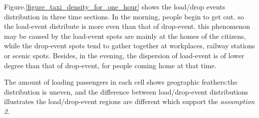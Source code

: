 Figure.\ref{figure_taxi_density_for_one_hour} shows the load/drop events distribution in three time sections. In the morning, people begin to get out. so the load-event distribute is more even than that of drop-event. this phenomenon may be caused by the load-event spots are mainly at the homes of the citizens, while the drop-event spots tend to gather together at workplaces, railway stations or scenic spots. Besides, in the evening, the dispersion of load-event is of lower degree than that of drop-event, for people coming home at that time.

The amount of loading passengers in each cell shows geographic feathers:the distribution is uneven, and the difference between load/drop-event distributions illustrates the load/drop-event regions are different which support the \emph{assumption 2}.
